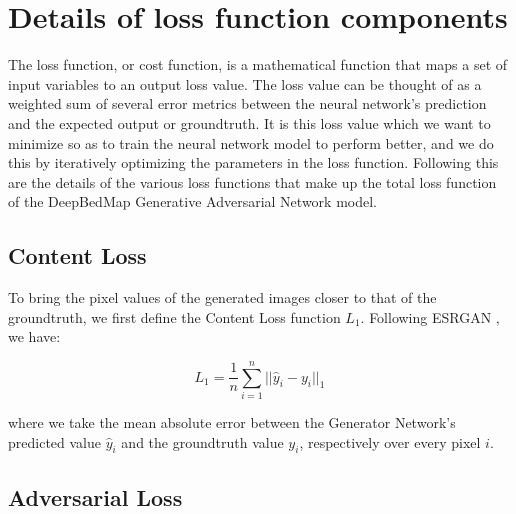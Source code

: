 \documentclass[tc, manuscript]{copernicus}
\begin{document}






\appendix

\section{Details of loss function components} \label{appendix:A}

The loss function, or cost function, is a mathematical function that maps a set of input variables to an output loss value.
The loss value can be thought of as a weighted sum of several error metrics between the neural network's prediction and the expected output or groundtruth.
It is this loss value which we want to minimize so as to train the neural network model to perform better, and we do this by iteratively optimizing the parameters in the loss function.
Following this are the details of the various loss functions that make up the total loss function of the DeepBedMap Generative Adversarial Network model.

\subsection{Content Loss}

To bring the pixel values of the generated images closer to that of the groundtruth, we first define the Content Loss function $L_1$.
Following ESRGAN \citep{WangESRGANEnhancedSuperResolution2019}, we have:

\begin{equation}\label{eq:A1}
  L_1 = \dfrac{1}{n} \sum\limits_{i=1}^n ||\hat{y}_i - y_i||_{1}
\end{equation}

where we take the mean absolute error between the Generator Network's predicted value $\hat{y}_i$ and the groundtruth value $y_i$, respectively over every pixel $i$.

\subsection{Adversarial Loss}
\end{document}
